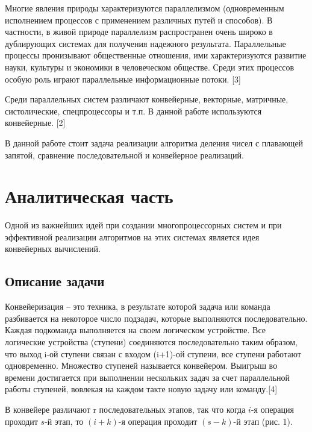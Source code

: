 \documentclass[a4paper,14pt]{article} %
\begin{document}
	 Многие явления природы характеризуются параллелизмом (одновременным исполнением процессов с применением различных путей и способов). В частности, в живой природе параллелизм распространен очень широко в дублирующих системах для получения надежного результата. Параллельные процессы пронизывают общественные отношения, ими характеризуются развитие науки, культуры и экономики в человеческом обществе. Среди этих процессов особую роль играют параллельные информационные потоки. [3]
	 
	 Среди параллельных систем различают конвейерные, векторные, матричные, систолические, спецпроцессоры и т.п. В данной работе используются конвейерные. [2]
	 
	 В данной работе стоит задача реализации алгоритма деления чисел с плавающей запятой, сравнение последовательной и конвейерное реализаций. 
		
	\newpage


        \section{Аналитическая часть}
        \hfill
        
        Одной из важнейших идей при создании многопроцессорных систем и при эффективной реализации алгоритмов на этих системах является идея конвейерных вычислений.
                
        
        \subsection{Описание задачи}
        \hfill
        
        Конвейеризация – это техника, в результате которой  задача или  команда разбивается  на некоторое число подзадач, которые  выполняются последовательно. Каждая  подкоманда   выполняется на своем логическом  устройстве.    Все     логические    устройства   (ступени)  соединяются последовательно таким образом, что выход  i-ой   ступени   связан   с   входом   (i+1)-ой   ступени,  все ступени  работают  одновременно.  Множество  ступеней называется    конвейером.    Выигрыш     во    времени достигается при  выполнении  нескольких задач  за  счет параллельной   работы   ступеней,  вовлекая  на  каждом такте новую задачу или команду.[4]

	В конвейере различают r последовательных этапов, так что когда $i$-я операция проходит $s$-й этап, то $(i+k)$-я операция проходит $(s-k)$-й этап (рис. 1).
	
\end{document}

